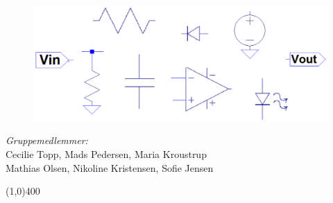 \begin{figure}[H]
	\centering
	\begin{minipage}[b]{1\textwidth}
		\includegraphics[width=\textwidth]{figures/Forside1.PNG}
	\end{minipage}
	\hfill
\end{figure}

\vspace*{\fill}
\begin{center}
	\textit{Gruppemedlemmer:}\\
	Cecilie Topp, Mads Pedersen, Maria Kroustrup \\
	Mathias Olsen, Nikoline Kristensen, Sofie Jensen
\end{center}
\begin{center}
\line(1,0){400}
\end{center}
